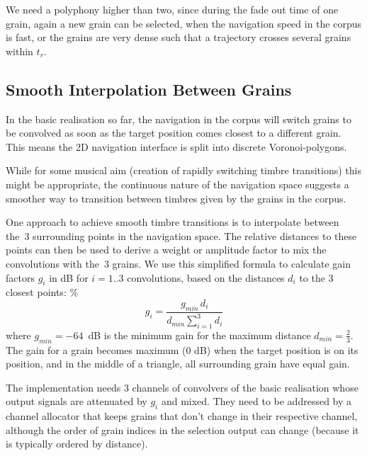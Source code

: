 We need a polyphony higher than two, since during the fade out time of one grain, again a new grain can be selected, when the navigation speed in the corpus is fast, or the grains are very dense such that a trajectory crosses several grains within $t_r$.

\subsection{Smooth Interpolation Between Grains}\label{sec:mix}

In the basic realisation so far, the navigation in the corpus will switch grains to be convolved as soon as the target position comes closest to a different grain.  
This means the 2D navigation interface is split into discrete Voronoi-polygons.

While for some musical aim (creation of rapidly switching timbre transitions) this might be appropriate, the continuous nature of the navigation space suggests a smoother way to transition between timbres given by the grains in the corpus.

One approach to achieve smooth timbre transitions is to interpolate between the~3 surrounding points in the navigation space.  The relative distances to these points can then be used to derive a weight or amplitude factor \cite{FreedMacCallumSchmederWessel-nime2010-hybridization-interfaces} to mix the convolutions with the~3 grains.  We use this simplified formula to calculate gain factors $g_i$ in dB for $i = 1..3$ convolutions, based on the distances $d_i$ to the 3 closest points:
%
\%
\begin{equation}
  g_i = \frac{g_{min} \, d_i}{d_{min} \sum_{i=1}^3 d_i}
\end{equation}
%
where $g_{min} = -64$~dB is the minimum gain for the maximum distance $d_{min} = \frac{2}{3}$.
The gain for a grain becomes maximum (0 dB) when the target position is on its position, and in the middle of a triangle, all surrounding grain have equal gain.

The implementation needs 3 channels of convolvers of the basic realisation whose output signals are attenuated by $g_i$ and mixed.  They need to be addressed by a channel allocator that keeps grains that don't change in their respective channel, although the order of grain indices in the selection output can change (because it is typically ordered by distance).
